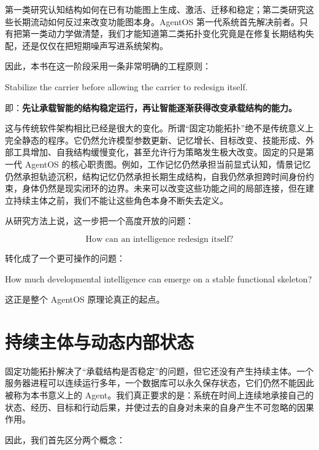 第一类研究认知结构如何在已有功能图上生成、激活、迁移和稳定；第二类研究这些长期流动如何反过来改变功能图本身。AgentOS 第一代系统首先解决前者。只有把第一类动力学做清楚，我们才能知道第二类拓扑变化究竟是在修复长期结构失配，还是仅仅在把短期噪声写进系统架构。

因此，本书在这一阶段采用一条非常明确的工程原则：

\begin{proposition*}
Stabilize the carrier before allowing the carrier to redesign itself.
\end{proposition*}

即：\textbf{先让承载智能的结构稳定运行，再让智能逐渐获得改变承载结构的能力。}

这与传统软件架构相比已经是很大的变化。所谓“固定功能拓扑”绝不是传统意义上完全静态的程序。它仍然允许模型参数更新、记忆增长、目标改变、技能形成、外部工具增加、自我结构缓慢变化，甚至允许行为策略发生极大改变。固定的只是第一代 AgentOS 的核心职责图。例如，工作记忆仍然承担当前显式认知，情景记忆仍然承担轨迹沉积，结构记忆仍然承担长期生成结构，自我仍然承担跨时间身份约束，身体仍然是现实闭环的边界。未来可以改变这些功能之间的局部连接，但在建立持续主体之前，我们不能让这些角色本身不断失去定义。

从研究方法上说，这一步把一个高度开放的问题：

\[
\text{How can an intelligence redesign itself?}
\]

转化成了一个更可操作的问题：

\begin{statementbox}
How much developmental intelligence can emerge on a stable functional skeleton?
\end{statementbox}

这正是整个 AgentOS 原理论真正的起点。

\section{持续主体与动态内部状态}

固定功能拓扑解决了“承载结构是否稳定”的问题，但它还没有产生持续主体。一个服务器进程可以连续运行多年，一个数据库可以永久保存状态，它们仍然不能因此被称为本书意义上的 Agent。我们真正要求的是：系统在时间上连续地承接自己的状态、经历、目标和行动后果，并使过去的自身对未来的自身产生不可忽略的因果作用。

因此，我们首先区分两个概念：

\begin{statementbox}
\centering
{}
\end{statementbox}

